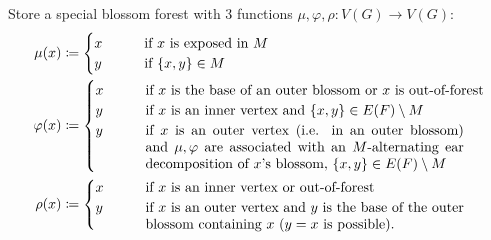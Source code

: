 \documentclass[11pt, a4paper]{article}
\newcommand{\set}[1]{\{#1\}}
\theoremstyle{remark}
\theoremstyle{definition}
\begin{document}
Store a special blossom forest with 3 functions $\mu,\varphi,\rho:
V(G)\to V(G)$:
\begin{align*}
	\mu(x)&\coloneqq \begin{cases}
		x \qquad&\text{if $x$ is exposed in $M$} \\
		y \qquad&\text{if $\set{x,y}\in M$}
	\end{cases} \\
	\varphi(x)&\coloneqq\begin{cases}
		x \qquad&\text{if $x$ is the base of an outer blossom or
			$x$ is out-of-forest} \\
		y \qquad&\text{if $x$ is an inner vertex and
			$\set{x,y}\in E(F)\setminus M$} \\
		y \qquad&\text{\parbox[t]{8cm}{if $x$ is an outer vertex
			(i.e. in an outer blossom)
			and $\mu,\varphi$ are associated with an
			$M$-alternating ear decomposition of $x$'s
			blossom, $\set{x,y}\in E(F)\setminus M$}}
	\end{cases} \\
	\rho(x)&\coloneqq\begin{cases}
		x \qquad&\text{if $x$ is an inner vertex or out-of-forest} \\
		y \qquad&\text{\parbox[t]{8cm}{if $x$ is an outer vertex
		and $y$ is the base of
			the outer blossom containing $x$ ($y=x$ is
			possible).}}
	\end{cases}
\end{align*}
\end{document}
